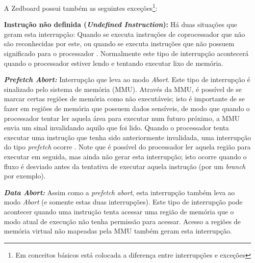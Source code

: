 
A Zedboard possui também as seguintes exceções\footnote{Em conceitos básicos está colocada a diferença entre interrupções e exceções}:

\textbf{Instrução não definida (\emph{Undefined Instruction}):} 
Há duas situações que geram esta interrupção: Quando se executa instruções de coprocessador que não são reconhecidas por este, ou quando se executa instruções que não possuem significado para o processador \cite[p.~36]{armarm}. Normalmente este tipo de interrupção acontecerá quando o processador estiver lendo e tentando executar lixo de memória.


\textbf{\emph{Prefetch Abort: }} Interrupção que leva ao modo \emph{Abort}. Este tipo de interrupção é sinalizado pelo sistema de memória (MMU). Através da MMU, é possível de se marcar certas regiões de memória como não executáveis; isto é importante de se fazer em regiões de memória que possuem dados sensíveis, de modo que quando o processador tentar ler aquela área para executar num futuro próximo, a MMU envia um sinal invalidando aquilo que foi lido. Quando o processador tenta executar uma instrução que tenha sido anteriormente invalidada, uma interrupção do tipo \emph{prefetch} ocorre \cite[p.~58]{armarm}. Note que é possível do processador ler aquela região para executar em seguida, mas ainda não gerar esta interrupção; isto ocorre quando o fluxo é desviado antes da tentativa de executar aquela instrução (por um \emph{branch} por exemplo).

\textbf{\emph{Data Abort:}} Assim como a \emph{prefetch abort}, esta interrupção também leva ao modo \emph{Abort} (e somente estas duas interrupções). Este tipo de interrupção pode acontecer quando uma instrução tenta acessar uma região de memória que o modo atual de execução não tenha permissão para acessar. Acesso a regiões de memória virtual não mapeadas pela MMU também geram esta interrupção.


